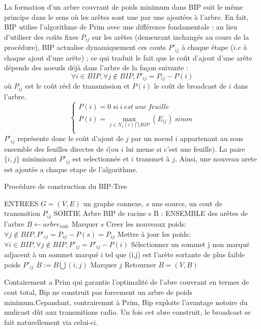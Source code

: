 La formation d'un arbre couvrant de poids minimum dans BIP suit le même principe dans le sens où les arêtes sont une par une ajoutées à l'arbre. En fait, BIP utilise l'algorithme de Prim avec une différence fondamentale : au lieu d'utiliser des coûts fixes $P_{ij}$ sur les arêtes (demeurant inchangés au cours de la procédure), BIP actualise dynamiquement ces couts $P'_{ij}$ à chaque étape ($i.e$ à chaque ajout d'une arête) ; ce qui traduit le fait que le coût d'ajout d'une arête dépends des noeuds déjà dans l'arbre de la façon suivante : 
$$ \forall i \in BIP, \forall j \notin BIP, P'_{ij}=P_{ij}-P(i)$$
où $P_{ij}$ est le coût réel de transmission et $P(i)$ le coût de broadcast de $i$ dans l'arbre.
$$\begin{cases}
	P(i)=0\ si\ i\ est\ une\ feuille\\
	P(i)=\max\limits_{j\in N_1(i)\bigcap BIP}(E_{ij})\ sinon\\
\end{cases}$$
 $P'_{ij}$ représente donc le coût d'ajout de $j$ par un noeud $i$ appartenant au sous ensemble des feuilles
directes de $i$(ou $i$ lui meme si c'est une feuille). La paire $\{i,j\}$ minimisant $P'_{ij}$ est selectionnée et $i$ transmet à $j$. Ainsi, une nouveau arete est ajoutée a chaque etape de l'algorithme.\\



\begin{algorithm}[h]
\caption{Procédure de construction du BIP-Tree}
\label{algo_BIP_tree}
\begin{algorithmic}
\STATE ENTREES  $G=(V,E)$ un graphe connexe, $s$ une source, un cout de transmition $P_{ij}$
\STATE SORTIE  Arbre BIP de racine s
\STATE B : ENSEMBLE des arêtes de l'arbre
\STATE  $B \leftarrow arbre_{vide}$
\STATE Marquer $s$
\STATE Creer les nouveaux poids: $\forall j \notin BIP, P'_{sj}=P_{sj}-P(s)=P_{sj}$
   \STATE Mettre à jour les poids:  $ \forall i \in BIP, \forall j \notin BIP, P'_{ij}=P'_{ij}-P(i)$
   \STATE Sélectionner un sommet j non marqué adjacent à un sommet marqué i tel que (i,j) est l'arête sortante de plus faible poids $P'_{ij}$
   \STATE $B := B\bigcup   {(i,j)}$
   \STATE Marquer $j$
\ENDWHILE
\STATE Retourner $B=(V,B)$
\end{algorithmic}
\end{algorithm}

Contairement a Prim qui garantie l'optimalité de l'abre couvrant en termes de cout total,
Bip ne construit pas forcement un arbre de poids minimum.Cepandant, contrairemnt à Prim, Bip exploite l'avantage notoire du mulicast dût aux transmitions radio. Un fois cet abre construit, le broadcast se fait naturellement via celui-ci.

